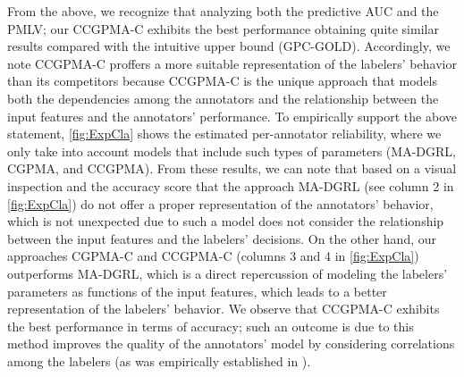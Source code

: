 \documentclass[journal]{IEEEtran}
\begin{document}
From the above, we recognize that analyzing both the predictive AUC and the PMLV; our CCGPMA-C exhibits the best performance obtaining quite similar results compared with the intuitive upper bound (GPC-GOLD). Accordingly, we note CCGPMA-C proffers a more suitable representation of the labelers' behavior than its competitors because CCGPMA-C is the unique approach that models both the dependencies among the annotators and the relationship between the input features and the annotators' performance. To empirically support the above statement, \cref{fig:ExpCla} shows the estimated per-annotator reliability, where we only take into account models that include such types of parameters (MA-DGRL, CGPMA, and CCGPMA). From these results, we can note that based on a visual inspection and the accuracy score that the approach MA-DGRL (see column 2 in \cref{fig:ExpCla}) do not offer a proper representation of the annotators' behavior, which is not unexpected due to such a model does not consider the relationship between the input features and the labelers' decisions. On the other hand, our approaches CGPMA-C and CCGPMA-C (columns 3 and 4 in \cref{fig:ExpCla}) outperforms MA-DGRL, which is a direct repercussion of modeling the labelers' parameters as functions of the input features, which leads to a better representation of the labelers' behavior. We observe that CCGPMA-C exhibits the best performance in terms of accuracy; such an outcome is due to this method improves the quality of the annotators' model by considering correlations among the labelers (as was empirically established in \cite{zhu2019unsupervised,gil2018learning}).
\end{document}
